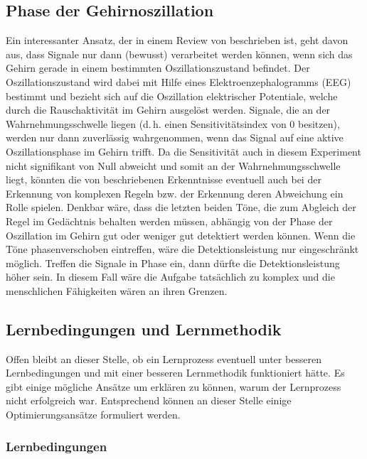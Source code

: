 \documentclass[doc,a4paper,12pt]{apa6}
\begin{document}
\subsection{Phase der Gehirnoszillation}

Ein interessanter Ansatz, der in einem Review von \textcite{vanrullen2011ongoing} beschrieben ist, geht davon aus, dass Signale nur dann (bewusst) verarbeitet werden können, wenn sich das Gehirn gerade in einem bestimmten Oszillationszustand befindet. Der Oszillationszustand wird dabei mit Hilfe eines Elektroenzephalogramms (EEG) bestimmt und bezieht sich auf die Oszillation elektrischer Potentiale, welche durch die Rauschaktivität im Gehirn ausgelöst werden. Signale, die an der Wahrnehmungsschwelle liegen (d.\,h. einen Sensitivitätsindex von 0 besitzen), werden nur dann zuverlässig wahrgenommen, wenn das Signal auf eine aktive Oszillationsphase im Gehirn trifft. Da die Sensitivität auch in diesem Experiment nicht signifikant von Null abweicht und somit an der Wahrnehmungsschwelle liegt, könnten die von \textcite{vanrullen2011ongoing} beschriebenen Erkenntnisse eventuell auch bei der Erkennung von komplexen Regeln bzw. der Erkennung deren Abweichung ein Rolle spielen. Denkbar wäre, dass die letzten beiden Töne, die zum Abgleich der Regel im Gedächtnis behalten werden müssen, abhängig von der Phase der Oszillation im Gehirn gut oder weniger gut detektiert werden können. Wenn die Töne phasenverschoben eintreffen, wäre die Detektionsleistung nur eingeschränkt möglich. Treffen die Signale in Phase ein, dann dürfte die Detektionsleistung höher sein. In diesem Fall wäre die Aufgabe tatsächlich zu komplex und die menschlichen Fähigkeiten wären an ihren Grenzen.

\subsection{Lernbedingungen und Lernmethodik}

Offen bleibt an dieser Stelle, ob ein Lernprozess eventuell unter besseren Lernbedingungen und mit einer besseren Lernmethodik funktioniert hätte. Es gibt einige mögliche Ansätze um erklären zu können, warum der Lernprozess nicht erfolgreich war. Entsprechend können an dieser Stelle einige Optimierungsansätze formuliert werden.

\subsubsection{Lernbedingungen}
\end{document}
